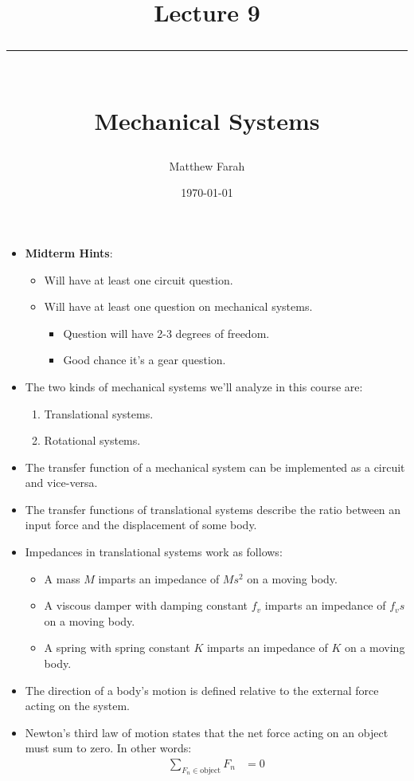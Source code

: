 \documentclass{article}
\date{
	\vspace{-.75em}
	{\large \today}
}
\title{
	\vspace*{-1.5em}
	{\Huge Lecture 9} \\
	\vspace{-1em}
	\rule{\textwidth/4}{.01em} \\
	\vspace{-.25em}
	{\Large Mechanical Systems}
	\vspace{-.75em}
}
\author{
	{\large Matthew Farah}
}
\begin{document}
\maketitle
\pagestyle{fancy}

\fi

\begin{itemize}
	\item \textbf{Midterm Hints}:
	\begin{itemize}
		\item Will have at least one circuit question.
		\item Will have at least one question on mechanical systems.
		\begin{itemize}
			\item Question will have 2-3 degrees of freedom.
			\item Good chance it's a gear question.
		\end{itemize}
	\end{itemize}
	\item The two kinds of mechanical systems we'll analyze in this course are:
	\begin{enumerate}
		\item Translational systems.
		\item Rotational systems.
	\end{enumerate}
	\item The transfer function of a mechanical system can be implemented as a circuit and vice-versa.
	\item The transfer functions of translational systems describe the ratio between an input force and the displacement of some body.
	\item Impedances in translational systems work as follows:
	\begin{itemize}
		\item A mass $M$ imparts an impedance of $Ms^2$ on a moving body.
		\item A viscous damper with damping constant $f_v$ imparts an impedance of $f_v s$ on a moving body.
		\item A spring with spring constant $K$ imparts an impedance of $K$ on a moving body.
	\end{itemize}
	\item The direction of a body's motion is defined relative to the external force acting on the system.
	\item Newton's third law of motion states that the net force acting on an object must sum to zero. In other words: \\
\begin{align*}
	\sum_{F_n \in \text{object}} F_n &= 0 \\
\end{align*}
\end{itemize}
\end{document}
